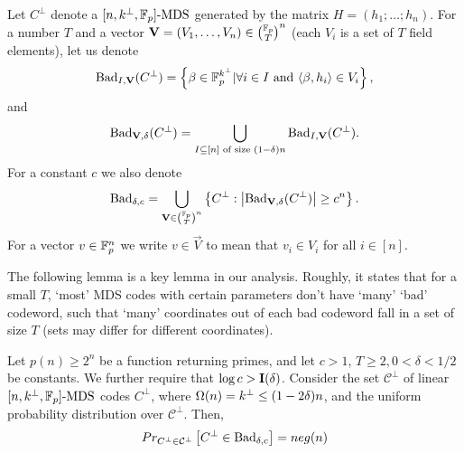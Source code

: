 Let $C^\bot$ denote a $[n,k^\bot,\mathbb{F}_p]\text{-MDS}$ generated by the matrix $H=(h_1;\ldots;h_n)$.
For a number $T$ and a vector $\vec{V}=(V_1,\ldots,V_n)\in {\binom{\F_p}{T}}^n$ (each $V_i$ is a set of $T$ field elements), let us denote  $$\textnormal{Bad}_{I,\mathbf{V}}(C^\bot) = \left\{\beta\in\mathbb{F}^{k^\bot}_p| \forall i\in I \text{ and } \langle\beta,h_i\rangle \in V_i\right\} ,$$ 
and $$\textnormal{Bad}_{\mathbf{V},\delta}(C^\bot)=\bigcup_{I\subseteq [n]\text{ of size }(1-\delta) n}\textnormal{Bad}_{I,\mathbf{V}}(C^\bot).$$
\noindent For a constant $c$ we also denote
$$\Bad{\delta}{c}=\bigcup_{\vec{V}\in{\binom{\F_p}{T}}^n}\left\{C^\bot:\left|\Bad{\vec{V}}{\delta}(C^\bot)\right|\geq c^n\right\}.$$
For a vector $v\in \mathbb{F}^n_p$ we write $v\in\vec{V}$ to mean that $v_i\in V_i$ for all $i \in [n]$. 

The following lemma is a key lemma in our analysis. Roughly, it states that for a small $T$, `most' MDS codes with certain parameters don't have `many' `bad' codeword, such that `many' coordinates out of each bad codeword fall in a set of size $T$ (sets may differ for different coordinates).

\begin{lemma}
\label{lem:sim}
Let $p(n) \geq 2^n$ be a function returning primes, and let $c>1$, $T\geq 2,0<\delta<1/2$ be constants. We further require that $\log{c}>\mathbf{I}({\delta})$. 
Consider the set $\mathcal{C}^\bot$ of linear $[n,k^\bot,\mathbb{F}_p]\text{-MDS}$ codes $C^\bot$, where $\Omega(n)=k^\bot\leq (1-2\delta)n$, and the uniform probability distribution over $\mathcal{C}^\bot$. 
Then,
$$Pr_{C^\bot\in \mathcal{C}^\bot}\left[C^\bot \in \textnormal{Bad}_{\delta,c}\right]=neg(n)$$

\end{lemma}


